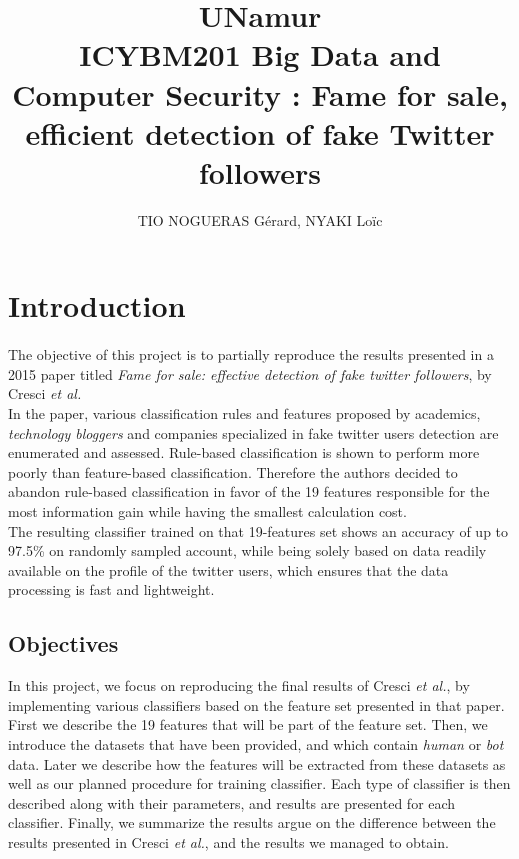 \documentclass[a4paper,11pt]{article}
\title{UNamur\\
	ICYBM201 Big Data and Computer Security : Fame for sale, efficient detection of fake Twitter
followers}
\author{TIO NOGUERAS Gérard, NYAKI Loïc}
\begin{document}
\maketitle

\newpage
\tableofcontents
\newpage

\section{Introduction}

\paragraph{}
The objective of this project is to partially reproduce the results presented in a 2015 paper titled  \textit{Fame for sale: effective detection of fake twitter followers}, by Cresci \textit{et al.}\\

In the paper, various classification rules and features proposed by academics, \textit{technology bloggers} and companies specialized in fake twitter users detection are enumerated and assessed. Rule-based classification is shown to perform more poorly than feature-based classification. Therefore the authors decided to abandon rule-based classification in favor of the 19 features responsible for the most information gain while having the smallest calculation cost.\\

The resulting classifier trained on that 19-features set shows an accuracy of up to 97.5\% on randomly sampled account, while being solely based on data readily available on the profile of the twitter users, which ensures that the data processing is fast and lightweight.

\subsection{Objectives}
In this project, we focus on reproducing the final results of Cresci \textit{et al.}, by implementing various classifiers based on the feature set presented in that paper.\\

First we describe the 19 features that will be part of the feature set. Then, we introduce the datasets that have been provided, and which contain \textit{human} or \textit{bot} data. Later we describe how the features will be extracted from these datasets as well as our planned procedure for training classifier. Each type of classifier is then described along with their parameters, and results are presented for each classifier. Finally, we summarize the results argue on the difference between the results presented in Cresci \textit{et al.}, and the results we managed to obtain.
\end{document}
